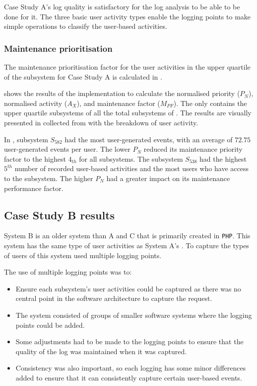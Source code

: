 Case Study A's log quality is satisfactory for the log analysis to be able to be done for it. The three basic user activity types enable the logging points to make simple operations to classify the user-based activities. 

\subsubsection{Maintenance prioritisation}
The maintenance prioritisation factor for the user activities in the upper quartile of the subsystem for Case Study A is calculated in .



 shows the results of the implementation  to calculate the normalised priority ($P_N$), normalised activity ($A_X$), and maintenance factor ($M_{PF}$). The  only contains the upper quartile subsystems of all the total subsystems of . The results are visually presented in  collected from  with the breakdown of user activity. \par In , subsystem $S_{582}$ had the most user-generated events, with an average of $72.75$ user-generated events per user. The lower $P_N$ reduced its maintenance priority factor to the highest $4_{th}$ for all subsystems. The subsystem $S_{538}$ had the highest $5^{th}$ number of recorded user-based activities and the most users who have access to the subsystem. The higher $P_N$ had a greater impact on its maintenance performance factor. 

\clearpage

\subsection{Case Study B results}\label{sec:ch3_csB}
System B is an older system than A and C that is primarily created in \texttt{PHP}. This system has the same type of user activities as System A's . To capture the types of users of  this system used multiple logging points.\par The use of multiple logging points was to:

\begin{itemize}
	\item Ensure each subsystem's user activities could be captured as there was no central point in the software architecture to capture the request. 
	\item The system consisted of groups of smaller software systems where the logging points could be added.
	\item Some adjustments had to be made to the logging points to ensure that the quality of the log was maintained when it was captured. 
	\item Consistency was also important, so each logging has some minor differences added to ensure that it can consistently capture certain user-based events. \
\end{itemize}

